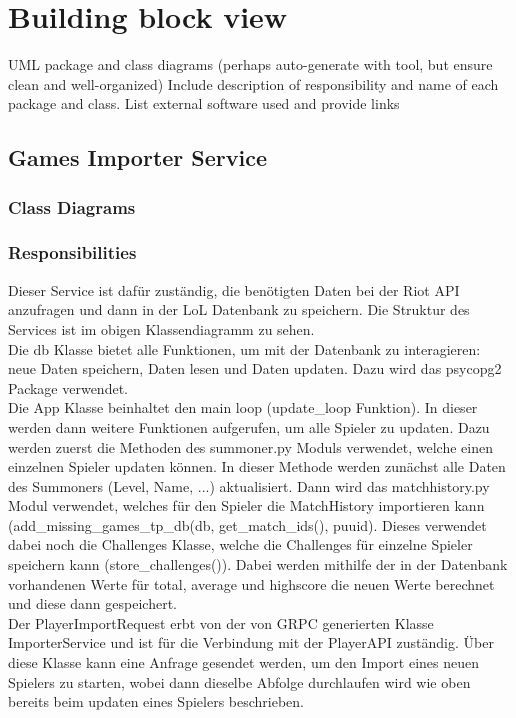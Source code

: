 \section{Building block view}
UML package and class diagrams (perhaps auto-generate with tool, but ensure clean and well-organized)
Include description of responsibility and name of each package and class.
List external software used and provide links


\subsection{Games Importer Service}
\subsubsection{Class Diagrams}
\subsubsection{Responsibilities}
Dieser Service ist dafür zuständig, die benötigten Daten bei der Riot API anzufragen und dann in der LoL Datenbank zu speichern. Die Struktur des Services ist im obigen Klassendiagramm zu sehen. \\
Die db Klasse bietet alle Funktionen, um mit der Datenbank zu interagieren: neue Daten speichern, Daten lesen und Daten updaten. Dazu wird das psycopg2 Package verwendet.\\
Die App Klasse beinhaltet den main loop (update\_loop Funktion). In dieser werden dann weitere Funktionen aufgerufen, um alle Spieler zu updaten. Dazu werden zuerst die Methoden des summoner.py Moduls verwendet, welche einen einzelnen Spieler updaten können. In dieser Methode werden zunächst alle Daten des Summoners (Level, Name, ...) aktualisiert. Dann wird das matchhistory.py Modul verwendet, welches für den Spieler die MatchHistory importieren kann (add\_missing\_games\_tp\_db(db, get\_match\_ids(), puuid). Dieses verwendet dabei noch die Challenges Klasse, welche die Challenges für einzelne Spieler speichern kann (store\_challenges()). Dabei werden mithilfe der in der Datenbank vorhandenen Werte für total, average und highscore die neuen Werte berechnet und diese dann gespeichert.\\

Der PlayerImportRequest erbt von der von GRPC generierten Klasse ImporterService und ist für die Verbindung mit der PlayerAPI zuständig. Über diese Klasse kann eine Anfrage gesendet werden, um den Import eines neuen Spielers zu starten, wobei dann dieselbe Abfolge durchlaufen wird wie oben bereits beim updaten eines Spielers beschrieben.

